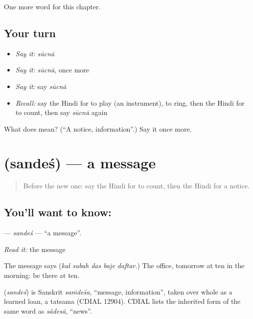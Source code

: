 \begin{grammarlens}[title={What you've built}]
One more word for this chapter.
\end{grammarlens}

\subsection*{Your turn}
\begin{itemize}
\raggedright
  \item \emph{Say it:} \emph{sūcnā}
  \item \emph{Say it:} \emph{sūcnā}, once more
  \item \emph{Say it:} say \emph{sūcnā}
  \item \emph{Recall:} say the Hindi for to play (an instrument), to ring, then the Hindi for to count, then say \emph{sūcnā} again
\end{itemize}

\begin{tcolorbox}[breakable,colback=teal!4,colframe=teal!35!black,title={Before you move on}]
What does  mean? (\textquotedblleft{}A notice, information\textquotedblright{}.) Say it once more.
\end{tcolorbox}
\section[\texorpdfstring{\hi{संदेश} (sandeś)}{संदेश (sandeś)}]{ (sandeś) — a message}

\label{lesson:HI-C166-sandesh}



\begin{quote}
Before the new one: say the Hindi for to count, then the Hindi for a notice.
\end{quote}

\subsection*{You'll want to know: }
\textbf{} — \emph{sandeś} — \textquotedblleft{}a message\textquotedblright{}.

\emph{Read it:} the message

The message says \textbf{    } (\emph{kal subah das baje daftar.}) The office, tomorrow at ten in the morning: be there at ten.

\begin{cousinweb}
\textbf{} (\emph{sandeś}) is Sanskrit \emph{saṁdeśa}, \textquotedblleft{}message, information\textquotedblright{}, taken over whole as a learned loan, a tatsama (CDIAL 12904). CDIAL lists the inherited form of the same word as \emph{sãdesā}, \textquotedblleft{}news\textquotedblright{}.
\end{cousinweb}


